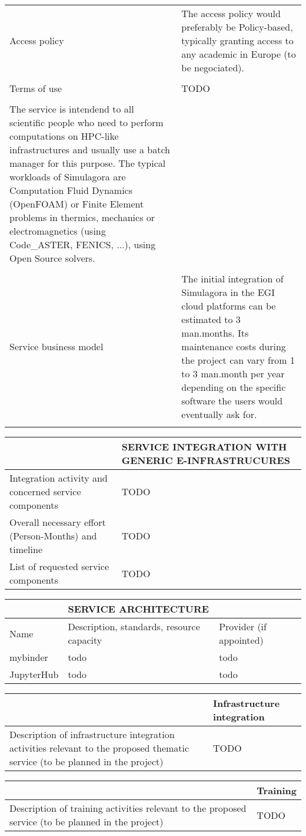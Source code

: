 \begin{tabular}{|p{7cm}|p{7cm}|}
\\
\\\hline
Access policy&
%
The access policy would preferably be Policy-based, typically granting
access to any academic in Europe (to be negociated).

\\
\\\hline
Terms of use&TODO\\
\\\hline
%
The service is intendend to all scientific people who need to perform
computations on HPC-like infrastructures and usually use a batch
manager for this purpose. The typical workloads of Simulagora are
Computation Fluid Dynamics (OpenFOAM) or Finite Element problems in
thermics, mechanics or electromagnetics (using Code\_ASTER, FENICS,
...), using Open Source solvers.

\\
\\\hline
Service business model&
%
The initial integration of Simulagora in the EGI cloud platforms can
be estimated to 3 man.months. Its maintenance costs during the project
can vary from 1 to 3 man.month per year depending on the specific
software the users would eventually ask for.

\\
\\\hline
\end{tabular}


\begin{tabular}{|p{7cm}|p{7cm}|}
&SERVICE INTEGRATION WITH GENERIC E-INFRASTRUCURES
\\\hline
Integration activity and concerned service components&TODO
\\\hline
Overall necessary effort (Person-Months) and timeline&TODO
\\\hline
List of requested service components&TODO
\\\hline
\end{tabular}

\begin{tabular}{|l|l|l|}
&SERVICE ARCHITECTURE&
\\\hline
Name&Description, standards, resource capacity&Provider (if appointed)
\\\hline
mybinder&todo&todo
\\\hline
JupyterHub&todo&todo
\\\hline
\end{tabular}

\begin{tabular}{|p{7cm}|l|}
  &Infrastructure integration
  \\\hline
  Description of infrastructure integration activities relevant to the proposed thematic service (to be planned in the project)&TODO
  \\\hline
\end{tabular}

\begin{tabular}{|p{7cm}|l|}
  &Training
  \\\hline
  Description of training activities relevant to the proposed service (to be planned in the project)&TODO
  \\\hline
\end{tabular}
